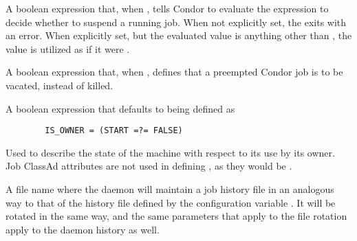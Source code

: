 \begin{description}
\label{param:WantSuspend}
\item[\Macro{WANT\_SUSPEND}]
  A boolean expression that, when ,
  tells Condor to evaluate the  expression to decide
  whether to suspend a running job.
  When not explicitly set, the  exits with an error.
  When explicitly set, but the evaluated value is anything other than
  , the value is utilized as if it were .

\label{param:WantVacate}
\item[\Macro{WANT\_VACATE}]
  A boolean expression that, when , defines that a preempted
  Condor job is to be vacated, instead of killed.

\label{param:IsOwner}
\item[\Macro{IS\_OWNER}]
  A boolean expression that defaults to being defined as
\begin{verbatim}
        IS_OWNER = (START =?= FALSE)
\end{verbatim}
  Used to describe the state of the machine with respect to its use
  by its owner.
  Job ClassAd attributes are not used in defining ,
  as they would be .

\label{param:StartdHistory}
\item[\Macro{STARTD\_HISTORY}]
  A file name where the  daemon will
  maintain a job history file in an analogous way to that of the 
  history file defined by the configuration variable .
  It will be rotated in the same way,
  and the same parameters that apply to the  file
  rotation apply to the  daemon history as well.

\end{description}




